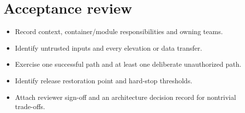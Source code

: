 \documentclass[11pt,letterpaper]{article}
\begin{document}
\section{Acceptance review}
\begin{itemize}
\item Record context, container/module responsibilities and owning teams.
\item Identify untrusted inputs and every elevation or data transfer.
\item Exercise one successful path and at least one deliberate unauthorized path.
\item Identify release restoration point and hard-stop thresholds.
\item Attach reviewer sign-off and an architecture decision record for nontrivial trade-offs.
\end{itemize}
\end{document}
